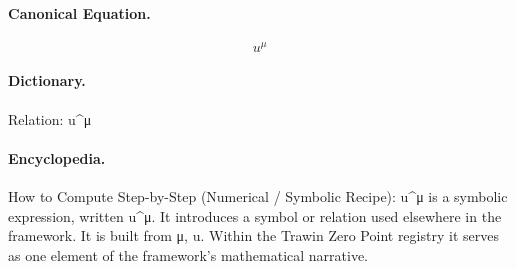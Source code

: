 \paragraph{Canonical Equation.}
\[
u^\mu
\]

\paragraph{Dictionary.}
Relation: u\textasciicircum{}μ

\paragraph{Encyclopedia.}
How to Compute Step-by-Step (Numerical / Symbolic Recipe): u\textasciicircum{}μ is a symbolic expression, written u\textasciicircum{}μ. It introduces a symbol or relation used elsewhere in the framework. It is built from μ, u. Within the Trawin Zero Point registry it serves as one element of the framework's mathematical narrative.
